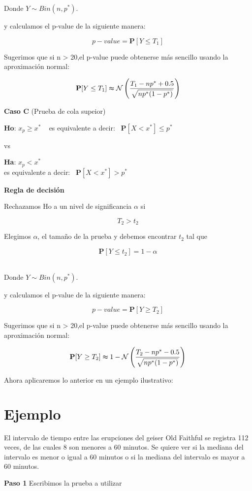 \documentclass[a4paper,oneside,openany]{book}
\begin{document}
Donde \(Y \sim Bin (n,p^*)\).

y calculamos el p-value de la siguiente manera:

\[p-value= \mathbf{P}[Y\leq T_{1}]\]

Sugerimos que si n \textgreater{} 20,el p-value puede obtenerse más
sencillo usando la aproximación normal:

\[\mathbf{P}[Y\leq T_{1}] \thickapprox \mathcal{N} \left(\frac{T_{1}-np^*+0.5}{\sqrt{np^*(1-p^*)}}\right)\]

\textbf{Caso C} (Prueba de cola supeior)

\textbf{Ho}: \(x_{p} \geq x^*\) ~ es equivalente a decir:
~\(\mathbf{P}[X < x^*]\leq p^*\)

vs

\textbf{Ha}: \(x_{p} < x^*\)\\
es equivalente a decir: ~\(\mathbf{P}[X < x^*]> p^*\)

\textbf{Regla de decisión}

Rechazamos Ho a un nivel de significancia \(\alpha\) si

\[T_{2} > t_{2}\]

Elegimos \(\alpha\), el tamaño de la prueba y debemos encontrar
\(t_{2}\) tal que

\[\mathbf{P}[Y \leq t_{2}]=1-\alpha\]~

Donde \(Y \sim Bin (n,p^*)\).

y calculamos el p-value de la siguiente manera:

\[p-value=\mathbf{P}[Y\geq T_{2}]\]

Sugerimos que si n \textgreater{} 20,el p-value puede obtenerse más
sencillo usando la aproximación normal:

\[\mathbf{P}[Y\geq T_{2}] \thickapprox 1- \mathcal{N} \left(\frac{T_{2}-np^*-0.5}{\sqrt{np^*(1-p^*)}}\right)\]

Ahora aplicaremos lo anterior en un ejemplo ilustrativo:

\section{Ejemplo}\label{ejemplo-1}

El intervalo de tiempo entre las erupciones del geiser Old Faithful se
registra 112 veces, de las cuales 8 son menores a 60 minutos. Se quiere
ver si la mediana del intervalo es menor o igual a 60 minutos o si la
mediana del intervalo es mayor a 60 minutos.

\textbf{Paso 1} Escribimos la prueba a utilizar
\end{document}
